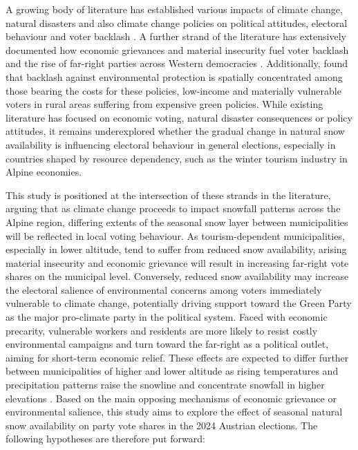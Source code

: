 \documentclass{article}
\begin{document}
A growing body of literature has established various impacts of climate change, natural disasters and also climate change policies on political attitudes, electoral behaviour and voter backlash \parencite{baccini2021, egan2012, Bernauer2013, bechtel2011}. A further strand of the literature has extensively documented how economic grievances and material insecurity fuel voter backlash and the rise of far-right parties across Western democracies \parencite{berman2021, haeusermann2020, rodrik2018, patterson2023}.
Additionally, \textcite{Halikiopoulou_Vrakopoulos_Arndt_2026} found that backlash against environmental protection is spatially concentrated among those bearing the costs for these policies, low-income and materially vulnerable voters in rural areas suffering from expensive green policies. 
While existing literature has focused on economic voting, natural disaster consequences or policy attitudes, it remains underexplored whether the gradual change in natural snow availability is influencing electoral behaviour in general elections, especially in countries shaped by resource dependency, such as the winter tourism industry in Alpine economies. 

This study is positioned at the intersection of these strands in the literature, arguing that as climate change proceeds to impact snowfall patterns across the Alpine region, differing extents of the seasonal snow layer between municipalities will be reflected in local voting behaviour. As tourism-dependent municipalities, especially in lower altitude, tend to suffer from reduced snow availability, arising material insecurity and economic grievance will result in increasing far-right vote shares on the municipal level.
Conversely, reduced snow availability may  increase the electoral salience of environmental concerns among voters immediately vulnerable to climate change, potentially driving support toward the Green Party as the major pro-climate party in the political system. Faced with economic precarity, vulnerable workers and residents are more likely to resist costly environmental campaigns and turn toward the far-right as a political outlet, aiming for short-term economic relief. 
These effects are expected to differ further between municipalities of higher and lower altitude as rising temperatures and precipitation patterns raise the snowline and concentrate snowfall in higher elevations \parencite{li2025}.  
Based on the main opposing mechanisms of economic grievance or environmental salience, this study aims to explore the effect of seasonal natural snow availability on party vote shares in the 2024 Austrian elections. The following hypotheses are therefore put forward: 
\vspace{1em}
\end{document}
